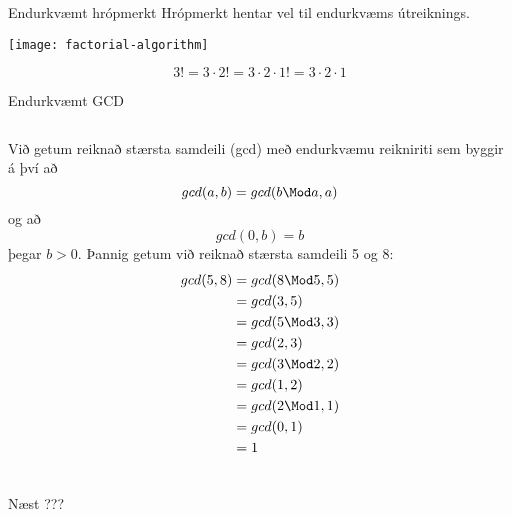 \documentclass[handout]{beamer}
\begin{document}
\begin{frame}{Endurkvæmt hrópmerkt}
Hrópmerkt hentar vel til endurkvæms útreiknings.
\begin{center}
\texttt{[image: factorial-algorithm]}
\end{center}
\[
3! = 3\cdot 2! = 3 \cdot 2 \cdot 1! = 3 \cdot 2 \cdot 1
\]
\end{frame}

\begin{frame}{Endurkvæmt GCD}
\begin{columns}
Við getum reiknað stærsta samdeili (gcd) með endurkvæmu reikniriti sem byggir á því að 
\[
 gcd(a,b) = gcd(b \Mod a, a)
\]
og að 
\[
 gcd(0,b) = b
\]
þegar $b > 0$.
Þannig getum við reiknað stærsta samdeili 5 og 8:
\begin{align*}
gcd(5,8) &= gcd(8 \Mod 5, 5)\\
&= gcd(3,5)\\
&= gcd(5 \Mod 3, 3)\\
&= gcd(2,3)\\
&= gcd(3 \Mod 2, 2)\\
&= gcd(1,2)\\
&= gcd(2 \Mod 1, 1)\\
&= gcd(0,1)\\
&= 1
\end{align*}

\end{columns}
\end{frame}



\begin{frame}{Næst}
???
\end{frame}
\end{document}
